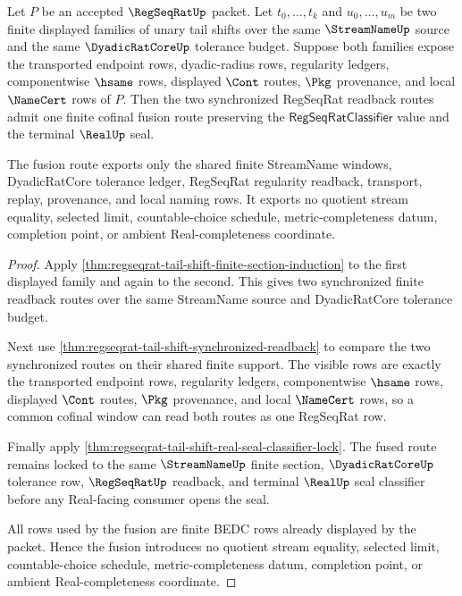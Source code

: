 \begin{theorem}
\label{thm:regseqrat-tail-shift-cofinal-fusion}
Let $P$ be an accepted $\RegSeqRatUp$ packet. Let $t_0,\ldots,t_k$ and $u_0,\ldots,u_m$ be two finite displayed families of unary tail shifts over the same $\StreamNameUp$ source and the same $\DyadicRatCoreUp$ tolerance budget. Suppose both families expose the transported endpoint rows, dyadic-radius rows, regularity ledgers, componentwise $\hsame$ rows, displayed $\Cont$ routes, $\Pkg$ provenance, and local $\NameCert$ rows of $P$. Then the two synchronized RegSeqRat readback routes admit one finite cofinal fusion route preserving the $\mathsf{RegSeqRatClassifier}$ value and the terminal $\RealUp$ seal.

The fusion route exports only the shared finite StreamName windows, DyadicRatCore tolerance ledger, RegSeqRat regularity readback, transport, replay, provenance, and local naming rows. It exports no quotient stream equality, selected limit, countable-choice schedule, metric-completeness datum, completion point, or ambient Real-completeness coordinate.
\end{theorem}
\begin{proof}
Apply \autoref{thm:regseqrat-tail-shift-finite-section-induction} to the first displayed family and again to the second. This gives two synchronized finite readback routes over the same StreamName source and DyadicRatCore tolerance budget.

Next use \autoref{thm:regseqrat-tail-shift-synchronized-readback} to compare the two synchronized routes on their shared finite support. The visible rows are exactly the transported endpoint rows, regularity ledgers, componentwise $\hsame$ rows, displayed $\Cont$ routes, $\Pkg$ provenance, and local $\NameCert$ rows, so a common cofinal window can read both routes as one RegSeqRat row.

Finally apply \autoref{thm:regseqrat-tail-shift-real-seal-classifier-lock}. The fused route remains locked to the same $\StreamNameUp$ finite section, $\DyadicRatCoreUp$ tolerance row, $\RegSeqRatUp$ readback, and terminal $\RealUp$ seal classifier before any Real-facing consumer opens the seal.

All rows used by the fusion are finite BEDC rows already displayed by the packet. Hence the fusion introduces no quotient stream equality, selected limit, countable-choice schedule, metric-completeness datum, completion point, or ambient Real-completeness coordinate.
\end{proof}

